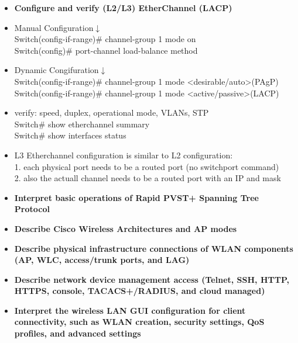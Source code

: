 \documentclass{article}
\begin{document}
\begin{itemize}
  \item \textbf{Configure and verify (L2/L3) EtherChannel (LACP)}
	\item[] Manual Configuration$\downarrow$\\
		Switch(config-if-range)\# channel-group 1 mode on\\
		Switch(config)\# port-channel load-balance method
	\item[] Dynamic Congifuration$\downarrow$\\
		Switch(config-if-range)\# channel-group 1 mode \textless desirable/auto\textgreater (PAgP)\\
		Switch(config-if-range)\# channel-group 1 mode \textless active/passive\textgreater (LACP)
	\item[] verify: speed, duplex, operational mode, VLANs, STP\\
		Switch\# show etherchannel summary\\
		Switch\# show interfaces status
	\item[] L3 Etherchannel configuration is similar to L2 configuration:\\
		1. each physical port needs to be a routed port (no switchport command)\\
		2. also the actuall channel needs to be a routed port with an IP and mask\\
  \item \textbf{Interpret basic operations of Rapid PVST+ Spanning Tree Protocol}
  \item \textbf{Describe Cisco Wireless Architectures and AP modes}
  \item \textbf{Describe physical infrastructure connections of WLAN components (AP, WLC, access/trunk ports, and LAG)}
  \item \textbf{Describe network device management access (Telnet, SSH, HTTP, HTTPS, console, TACACS+/RADIUS, and cloud managed)}
  \item \textbf{Interpret the wireless LAN GUI configuration for client connectivity, such as WLAN creation, security settings, QoS profiles, and advanced settings}\\
\end{itemize}
\end{document}
